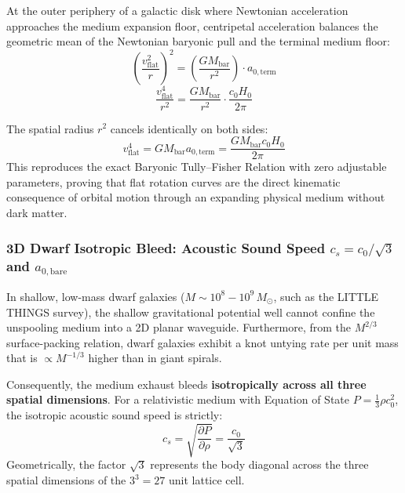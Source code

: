 \documentclass[11pt,a4paper]{article}
\begin{document}
At the outer periphery of a galactic disk where Newtonian acceleration approaches the medium expansion floor, centripetal acceleration balances the geometric mean of the Newtonian baryonic pull and the terminal medium floor:
\begin{equation}
\left(\frac{v_{\text{flat}}^2}{r}\right)^2 = \left(\frac{G M_{\text{bar}}}{r^2}\right) \cdot a_{0,\text{term}}
\end{equation}
\begin{equation}
\frac{v_{\text{flat}}^4}{r^2} = \frac{G M_{\text{bar}}}{r^2} \cdot \frac{c_0 H_0}{2\pi}
\end{equation}

The spatial radius $r^2$ cancels identically on both sides:
\begin{equation}
v_{\text{flat}}^4 = G M_{\text{bar}} a_{0,\text{term}} = \frac{G M_{\text{bar}} c_0 H_0}{2\pi}
\label{eq:btfr_pwc_exact}
\end{equation}
This reproduces the exact Baryonic Tully--Fisher Relation with zero adjustable parameters, proving that flat rotation curves are the direct kinematic consequence of orbital motion through an expanding physical medium without dark matter.

\subsubsection{3D Dwarf Isotropic Bleed: Acoustic Sound Speed $c_s = c_0/\sqrt{3}$ and $a_{0,\text{bare}}$}
\label{subsubsec:a0_bare_derivation}

In shallow, low-mass dwarf galaxies ($M \sim 10^8 - 10^9\,M_\odot$, such as the LITTLE THINGS survey), the shallow gravitational potential well cannot confine the unspooling medium into a 2D planar waveguide. Furthermore, from the $M^{2/3}$ surface-packing relation, dwarf galaxies exhibit a knot untying rate per unit mass that is $\propto M^{-1/3}$ higher than in giant spirals.

Consequently, the medium exhaust bleeds \textbf{isotropically across all three spatial dimensions}. For a relativistic medium with Equation of State $P = \frac{1}{3}\rho c_0^2$, the isotropic acoustic sound speed is strictly:
\begin{equation}
c_s = \sqrt{\frac{\partial P}{\partial \rho}} = \frac{c_0}{\sqrt{3}}
\label{eq:sound_speed_rel}
\end{equation}
Geometrically, the factor $\sqrt{3}$ represents the body diagonal across the three spatial dimensions of the $3^3 = 27$ unit lattice cell.
\end{document}
